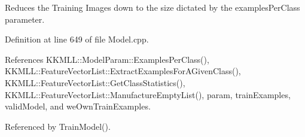 Reduces the Training Images down to the size dictated by the \textquotesingle{}examples\+Per\+Class\textquotesingle{} parameter. 



Definition at line 649 of file Model.\+cpp.



References K\+K\+M\+L\+L\+::\+Model\+Param\+::\+Examples\+Per\+Class(), K\+K\+M\+L\+L\+::\+Feature\+Vector\+List\+::\+Extract\+Examples\+For\+A\+Given\+Class(), K\+K\+M\+L\+L\+::\+Feature\+Vector\+List\+::\+Get\+Class\+Statistics(), K\+K\+M\+L\+L\+::\+Feature\+Vector\+List\+::\+Manufacture\+Empty\+List(), param, train\+Examples, valid\+Model, and we\+Own\+Train\+Examples.



Referenced by Train\+Model().


